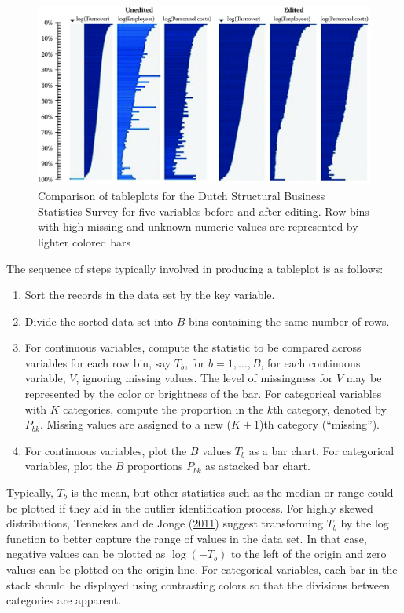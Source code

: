 \documentclass[]{krantz}
\begin{document}
\begin{figure}

{\centering \includegraphics[width=0.7\linewidth]{ChapterError/figures/fig10-7} 

}

\caption{Comparison of tableplots for the Dutch Structural Business Statistics Survey for five variables before and after editing. Row bins with high missing and unknown numeric values are represented by lighter colored bars}\label{fig:fig10-7}
\end{figure}

The sequence of steps typically involved in producing a tableplot is as
follows:

\begin{enumerate}
\def\labelenumi{\arabic{enumi}.}
\item
  Sort the records in the data set by the key variable.
\item
  Divide the sorted data set into \(B\) bins containing the same number
  of rows.
\item
  For continuous variables, compute the statistic to be compared across
  variables for each row bin, say \(T_{b}\), for \(b = 1,\ldots ,B\),
  for each continuous variable, \(V\), ignoring missing values. The
  level of missingness for \(V\) may be represented by the color or
  brightness of the bar. For categorical variables with \(K\)
  categories, compute the proportion in the \(k\)th category, denoted by
  \(P_{bk}\). Missing values are assigned to a new (\(K+1\))th category
  (``missing'').
\item
  For continuous variables, plot the \(B\) values \(T_{b}\) as a bar
  chart. For categorical variables, plot the \(B\) proportions
  \(P_{bk}\) as astacked bar chart.
\end{enumerate}

Typically, \(T_{b}\) is the mean, but other statistics such as the
median or range could be plotted if they aid in the outlier
identification process. For highly skewed distributions, Tennekes and de
Jonge (\protect\hyperlink{ref-tennekes2011top}{2011}) suggest
transforming \(T_{b}\) by the log function to better capture the range
of values in the data set. In that case, negative values can be plotted
as \(\log(-T_{b})\) to the left of the origin and zero values can be
plotted on the origin line. For categorical variables, each bar in the
stack should be displayed using contrasting colors so that the divisions
between categories are apparent.
\end{document}
